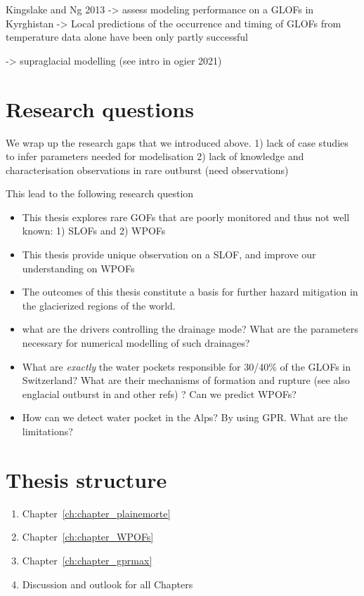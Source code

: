 Kingslake and Ng 2013 -> assess modeling performance on a GLOFs in Kyrghistan -> Local predictions of the occurrence and timing of GLOFs from temperature data alone have been only partly successful


\cite{Kingslake&al2015} -> supraglacial modelling (see intro in ogier 2021)


\section{Research questions}

We wrap up the research gaps that we introduced above. 
1) lack of case studies to infer parameters needed for modelisation 
2) lack of knowledge and characterisation observations in rare outburst (need observations)

This lead to the following research question


\begin{itemize}
   \item This thesis explores rare GOFs that are poorly monitored and thus not well known: 1) SLOFs and 2) WPOFs
    \item This thesis provide unique observation on a SLOF, and improve our understanding on WPOFs 
    \item The outcomes of this thesis constitute a basis for further hazard mitigation in the glacierized regions of the world.
    \item  what are the drivers controlling the drainage mode? What are the parameters necessary for numerical modelling of such drainages?
    \item What are \textit{exactly} the water pockets responsible for 30/40\% of the GLOFs in Switzerland? What are their mechanisms of formation and rupture (see also englacial outburst in \cite{Korup&Tweed2007} and other refs) ? Can we predict WPOFs?
    \item  How can we detect water pocket in the Alps? By using GPR. What are the limitations?
\end{itemize}

\section{Thesis structure}


\begin{enumerate}
\item Chapter~\ref{ch:chapter_plainemorte}
\item Chapter~\ref{ch:chapter_WPOFs}
\item Chapter~\ref{ch:chapter_gprmax}
\item Discussion and outlook for all Chapters
\end{enumerate}


